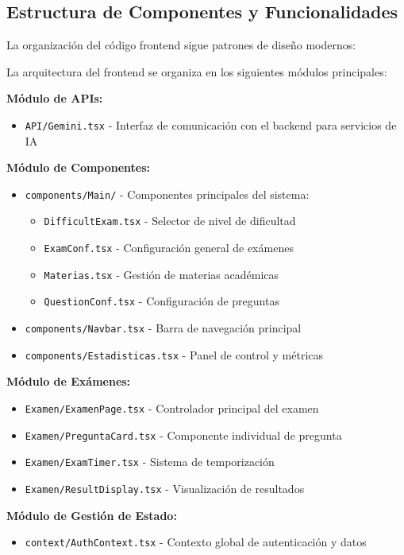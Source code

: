 \documentclass[12pt,a4paper]{report}
\begin{document}
\subsection{Estructura de Componentes y Funcionalidades}

La organización del código frontend sigue patrones de diseño modernos:

La arquitectura del frontend se organiza en los siguientes módulos principales:

\textbf{Módulo de APIs:}
\begin{itemize}
\item \texttt{API/Gemini.tsx} - Interfaz de comunicación con el backend para servicios de IA
\end{itemize}

\textbf{Módulo de Componentes:}
\begin{itemize}
\item \texttt{components/Main/} - Componentes principales del sistema:
  \begin{itemize}
  \item \texttt{DifficultExam.tsx} - Selector de nivel de dificultad
  \item \texttt{ExamConf.tsx} - Configuración general de exámenes
  \item \texttt{Materias.tsx} - Gestión de materias académicas
  \item \texttt{QuestionConf.tsx} - Configuración de preguntas
  \end{itemize}
\item \texttt{components/Navbar.tsx} - Barra de navegación principal
\item \texttt{components/Estadisticas.tsx} - Panel de control y métricas
\end{itemize}

\textbf{Módulo de Exámenes:}
\begin{itemize}
\item \texttt{Examen/ExamenPage.tsx} - Controlador principal del examen
\item \texttt{Examen/PreguntaCard.tsx} - Componente individual de pregunta
\item \texttt{Examen/ExamTimer.tsx} - Sistema de temporización
\item \texttt{Examen/ResultDisplay.tsx} - Visualización de resultados
\end{itemize}

\textbf{Módulo de Gestión de Estado:}
\begin{itemize}
\item \texttt{context/AuthContext.tsx} - Contexto global de autenticación y datos
\end{itemize}
\end{document}
